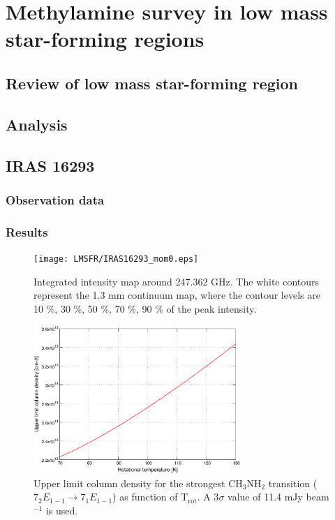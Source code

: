 \chapter{Methylamine survey in low mass star-forming regions
  \label{chap:LMSFRs}}

\section{Review of low mass star-forming region}
\section{Analysis}

\section{IRAS 16293}
\subsection{Observation data}
\subsection{Results}

\begin{figure}[htbp]
  \centering
  \texttt{[image: LMSFR/IRAS16293\_mom0.eps]}
  \caption{Integrated intensity map around 247.362 GHz. The white contours represent the 1.3 mm continuum map, where the contour levels are 10 \%, 30 \%, 50 \%, 70 \%, 90 \% of the peak intensity.}
  \label{IRAS16293_mom0}
\end{figure}

\begin{figure}[htbp]
  \centering
  \includegraphics[width=0.7\textwidth]{LMSFR/IRAS16293.eps}
  \caption{Upper limit column density for the strongest CH$_{3}$NH$_{2}$ transition
  ($7_{2}E_{1-1} \rightarrow 7_{1}E_{1-1}$) as function of T$_{\textrm{rot}}$. A 3$\sigma$ value of 
  11.4 mJy beam$^{-1}$ is used.}
  \label{IRAS16293_MA}
\end{figure}


